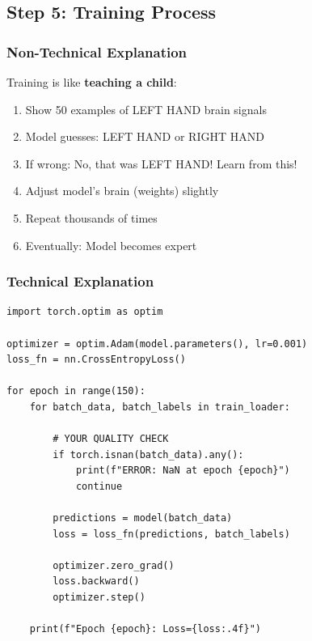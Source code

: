 \documentclass[12pt,a4paper]{article}
\begin{document}
\subsection{Step 5: Training Process}

\subsubsection{Non-Technical Explanation}

Training is like \textbf{teaching a child}:

\begin{tcolorbox}[colback=yellow!10,colframe=orange!50!black,title=Training Analogy]
\begin{enumerate}
    \item Show 50 examples of LEFT HAND brain signals
    \item Model guesses: LEFT HAND or RIGHT HAND
    \item If wrong: No, that was LEFT HAND! Learn from this!
    \item Adjust model's brain (weights) slightly
    \item Repeat thousands of times
    \item Eventually: Model becomes expert
\end{enumerate}
\end{tcolorbox}

\subsubsection{Technical Explanation}

\begin{lstlisting}[caption={Training Loop with Quality Checks}]
import torch.optim as optim

optimizer = optim.Adam(model.parameters(), lr=0.001)
loss_fn = nn.CrossEntropyLoss()

for epoch in range(150):
    for batch_data, batch_labels in train_loader:
        
        # YOUR QUALITY CHECK
        if torch.isnan(batch_data).any():
            print(f"ERROR: NaN at epoch {epoch}")
            continue
        
        predictions = model(batch_data)
        loss = loss_fn(predictions, batch_labels)
        
        optimizer.zero_grad()
        loss.backward()
        optimizer.step()
    
    print(f"Epoch {epoch}: Loss={loss:.4f}")
\end{lstlisting}
\end{document}
